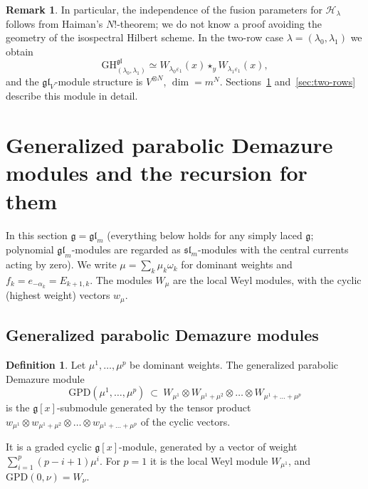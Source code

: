 \documentclass[11pt]{amsart}
\numberwithin{equation}{section}
\theoremstyle{definition}
\newtheorem{definition}[equation]{Definition}
\newtheorem{remark}[equation]{Remark}
\newcommand{\gl}{\mathfrak{gl}}
\newcommand{\fg}{\mathfrak{g}}
\newcommand{\GPD}{\mathrm{GPD}}         %
\newcommand{\GH}{\mathrm{GH}}         %
\newcommand{\eps}{\varepsilon}
\begin{document}
	\begin{remark}
		In particular, the independence of the fusion parameters for $\mathcal H_\lambda$ follows from Haiman's $N!$-theorem; we do not know a proof avoiding the geometry of the isospectral Hilbert scheme. In the two-row case $\lambda=(\lambda_0,\lambda_1)$ we obtain
		\[
		\GH^{\gl}_{(\lambda_0,\lambda_1)}\simeq W_{\lambda_0\eps_1}(x)\star_yW_{\lambda_1\eps_1}(x),
		\]
		and the $\gl_V$-module structure is $V^{\otimes N}$, $\dim=m^N$. Sections~\ref{sec:GPD} and~\ref{sec:two-rows} describe this module in detail.
	\end{remark}
	
	\section{Generalized parabolic Demazure modules and the recursion for them}\label{sec:GPD}
	
	In this section $\fg=\gl_m$ (everything below holds for any simply laced $\fg$; polynomial $\gl_m$-modules are regarded as $\mathfrak{sl}_m$-modules with the central currents acting by zero). We write $\mu=\sum_k\mu_k\omega_k$ for dominant weights and $f_k=e_{-\alpha_k}=E_{k+1,k}$. The modules $W_\mu$ are the local Weyl modules, with the cyclic (highest weight) vectors $w_\mu$.
	
	\subsection{Generalized parabolic Demazure modules}\label{ssec:GPD-def}
	
	\begin{definition}\label{def:GPD}
		Let $\mu^1,\dots,\mu^p$ be dominant weights. The generalized parabolic Demazure module
		\[
		\GPD(\mu^1,\dots,\mu^p)\ \subset\ W_{\mu^1}\otimes W_{\mu^1+\mu^2}\otimes\dots\otimes W_{\mu^1+\dots+\mu^p}
		\]
		is the $\fg[x]$-submodule generated by the tensor product $w_{\mu^1}\otimes w_{\mu^1+\mu^2}\otimes\dots\otimes w_{\mu^1+\dots+\mu^p}$ of the cyclic vectors.
	\end{definition}
	
	It is a graded cyclic $\fg[x]$-module, generated by a vector of weight $\sum_{i=1}^p(p-i+1)\mu^i$. For $p=1$ it is the local Weyl module $W_{\mu^1}$, and $\GPD(0,\nu)=W_\nu$.
	
\end{document}
